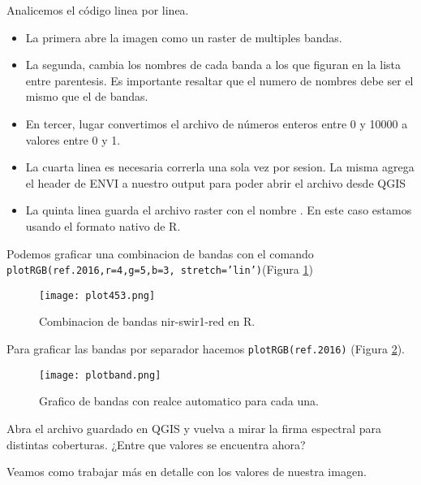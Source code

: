 \begin{exa}
    Analicemos el c\'odigo linea por linea.
    \begin{itemize}
    \item La primera abre la imagen como  un raster de multiples bandas.
    \item La segunda, cambia los nombres de cada banda a los que figuran en la
          lista entre parentesis. Es importante resaltar que el numero de nombres
          debe ser el mismo que el de bandas.
    \item En tercer, lugar convertimos el archivo de n\'umeros enteros entre 0 y
          10000 a valores entre 0 y 1.
    \item La cuarta linea es necesaria correrla una sola vez por sesion. La misma
          agrega el header de ENVI a nuestro output para poder abrir el archivo
          desde QGIS
      \item La quinta linea guarda el archivo raster con el nombre 
          . En este caso estamos usando el formato nativo de R.
    \end{itemize}
    Podemos graficar una combinacion de bandas con el comando
    \texttt{plotRGB(ref.2016,r=4,g=5,b=3, stretch='lin')}(Figura \ref{fig:plot453})
    \begin{figure}[h!]
    \begin{center}
        \texttt{[image: plot453.png]}
    \end{center}
    \caption{Combinacion de bandas nir-swir1-red en R.}
    \label{fig:plot453}
    \end{figure}
    Para graficar las bandas por separador hacemos \texttt{plotRGB(ref.2016)}
    (Figura \ref{fig:plotband}).
    \begin{figure}[h!]
    \begin{center}
        \texttt{[image: plotband.png]}
    \end{center}
    \caption{Grafico de bandas con realce automatico para cada una.}
    \label{fig:plotband}
    \end{figure}

\end{exa}

\begin{act}
   Abra el archivo guardado en QGIS y vuelva a mirar la firma espectral para
   distintas coberturas. ¿Entre que valores se encuentra ahora?
\end{act}

Veamos como trabajar m\'as en detalle con los valores de nuestra imagen.

